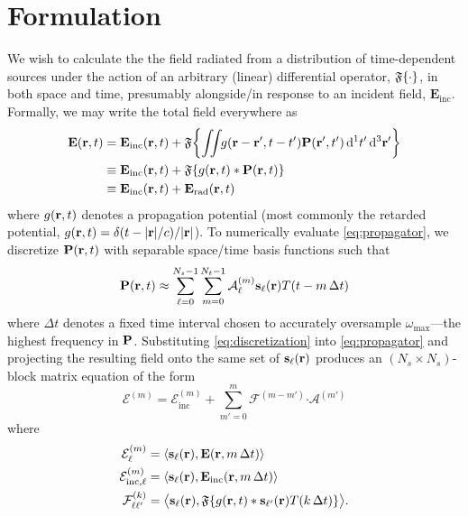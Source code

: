 \section{Formulation}

We wish to calculate the the field radiated from a distribution of time-dependent sources under the action of an arbitrary (linear) differential operator, $\mathfrak{F}\qty{\cdot}$, in both space and time, presumably alongside/in response to an incident field, $\mathbf{E}_\text{inc}$.
Formally, we may write the total field everywhere as
\begin{equation}
  \begin{aligned}
    \vb{E}(\vb{r}, t) & = \vb{E}_\text{inc}(\vb{r}, t) + \mathfrak{F}\qty{\iint_{} \kern0.1emg(\vb{r} - \vb{r}', t - t') \vb{P}(\vb{r}', t') \dd[1]{t'} \dd[3]{\vb{r}'}} \\
                      & \equiv \vb{E}_\text{inc}(\vb{r}, t) + \mathfrak{F}\qty{g(\vb{r}, t) \ast \vb{P}(\vb{r}, t)} \\
                      & \equiv \vb{E}_\text{inc}(\vb{r}, t) + \vb{E}_\text{rad}(\vb{r}, t)
    \end{aligned}
  \label{eq:propagator}
\end{equation}
where $g(\vb{r}, t)$ denotes a propagation potential (most commonly the retarded potential, $g(\vb{r}, t) = \delta(t - \abs{\vb{r}}/c)/\abs{\vb{r}}$).
To numerically evaluate \cref{eq:propagator}, we discretize $\vb{P}(\vb{r}, t)$ with separable space/time basis functions such that 
\begin{equation}
  \vb{P}(\vb{r}, t) \approx \sum_{\ell = 0}^{N_s - 1} \sum_{m = 0}^{N_t - 1} \mathcal{A}_\ell^{(m)} \vb{s}_\ell(\vb{r}) T(t - m \, \Delta t)
  \label{eq:discretization}
\end{equation}
where $\Delta t$ denotes a fixed time interval chosen to accurately oversample $\omega_\text{max}$---the highest frequency in $\vb{P}$.
Substituting \cref{eq:discretization} into \cref{eq:propagator} and projecting the resulting field onto the same set of $\vb{s}_\ell(\vb{r})$ produces an $(N_s \times N_s)$-block matrix equation of the form
\begin{equation}
  \mathcal{E}^{(m)} = \mathcal{E}_\text{inc}^{(m)} + \sum_{m'= 0}^m \mathcal{F}^{(m - m')} \boldsymbol{\cdot} \mathcal{A}^{(m')}
  \label{eq:mot}
\end{equation}
where
\begin{subequations}
  \begin{align}
    \mathcal{E}^{(m)}_\ell &= \langle \vb{s}_\ell(\vb{r}), \vb{E}(\vb{r}, m \, \Delta t) \rangle \label{eq:f elements}\\
    \mathcal{E}^{(m)}_{\text{inc},\ell} &= \langle \vb{s}_\ell(\vb{r}), \vb{E}_\text{inc}(\vb{r}, m \, \Delta t) \rangle \label{eq:l elements}\\
    \mathcal{F}^{(k)}_{\ell\ell'} &= \big\langle \vb{s}_\ell(\vb{r}), \mathfrak{F}\qty{g(\vb{r}, t) \ast \vb{s}_{\ell'}(\vb{r}) T(k \, \Delta t)} \big\rangle \label{eq:z elements}.
  \end{align}
\end{subequations}

